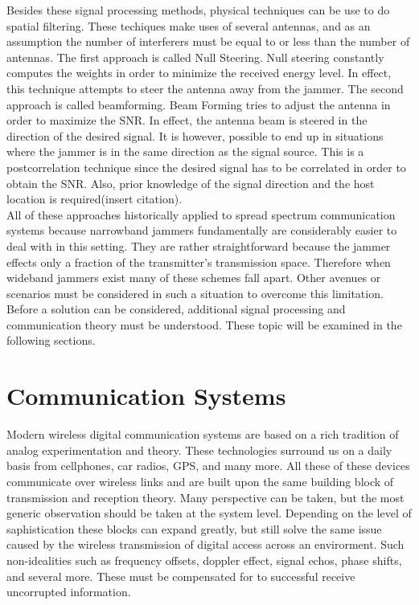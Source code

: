 Besides these signal processing methods, physical techniques can be use to do spatial filtering.  These techiques make uses of several antennas, and as an assumption the number of interferers must be equal to or less than the number of antennas.  The first approach is called Null Steering.  Null steering constantly computes the weights in order to minimize the received energy level. In effect, this technique attempts to steer the antenna away from the jammer.  The second approach is called beamforming.  Beam Forming tries to adjust the antenna in order to maximize the SNR. In effect, the antenna beam is steered in the direction of the desired signal.  It is however, possible to end up in situations where the jammer is in the same direction as the signal source. This is a postcorrelation technique since the desired signal has to be correlated in order to obtain the SNR. Also, prior knowledge of the signal direction and the host location is required(insert citation).\\


All of these approaches historically applied to spread spectrum communication systems because narrowband jammers fundamentally are considerably easier to deal with in this setting.  They are rather straightforward because the jammer effects only a fraction of the transmitter's transmission space.  Therefore when wideband jammers exist many of these schemes fall apart.  Other avenues or scenarios must be considered in such a situation to overcome this limitation.  Before a solution can be considered, additional signal processing and communication theory must be understood.  These topic will be examined in the following sections.\\



\section{Communication Systems}

Modern wireless digital communication systems are based on a rich tradition of analog experimentation and theory.  These technologies surround us on a daily basis from cellphones, car radios, GPS, and many more.  All these of these devices communicate over wireless links and are built upon the same building block of transmission and reception theory.  Many perspective can be taken, but the most generic observation should be taken at the system level.  Depending on the level of saphistication these blocks can expand greatly, but still solve the same issue caused by the wireless transmission of digital access across an envirorment.  Such non-idealities such as frequency offsets, doppler effect, signal echos, phase shifts, and several more.  These must be compensated for to successful receive uncorrupted information.\\ 

